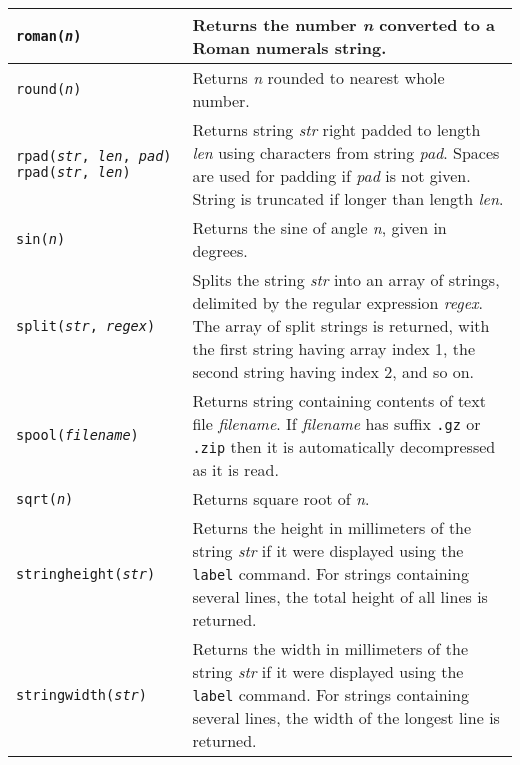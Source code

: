 \begin{longtable}{|p{5cm}|p{7cm}|}
\hline

\texttt{roman(\textit{n})} &
Returns the number \textit{n} converted to a Roman numerals string. \\

\hline

\texttt{round(\textit{n})} &
Returns \textit{n} rounded to nearest whole number. \\

\hline

\texttt{rpad(\textit{str}, \textit{len}, \textit{pad})}
\texttt{rpad(\textit{str}, \textit{len})} &
Returns string \textit{str} right padded to length \textit{len}
using characters from string \textit{pad}.
Spaces are used for padding if \textit{pad} is not given.
String is truncated if longer than length \textit{len}. \\

\hline

\texttt{sin(\textit{n})} &
Returns the sine of angle \textit{n}, given in degrees. \\

\hline

\texttt{split(\textit{str}, \textit{regex})} &
Splits the string \textit{str} into an array of strings, delimited by the
regular expression \textit{regex}.
The array of split strings is returned,
with the first string having array index 1, the
second string having index 2, and so on. \\

\hline

\texttt{spool(\textit{filename})} &
Returns string containing contents of text file \textit{filename}.
If \textit{filename} has suffix
\texttt{.gz} or \texttt{.zip}
then it is automatically decompressed as it is read.  \\

\hline

\texttt{sqrt(\textit{n})} &
Returns square root of \textit{n}. \\

\hline

\texttt{stringheight(\textit{str})} &
Returns the height in millimeters of the string \textit{str}
if it were displayed using the \texttt{label} command.
For strings containing several lines, the total height of all
lines is returned.  \\

\hline

\texttt{stringwidth(\textit{str})} &
Returns the width in millimeters of the string \textit{str}
if it were displayed using the \texttt{label} command.
For strings containing several lines, the width of the longest
line is returned.  \\


\end{longtable}
